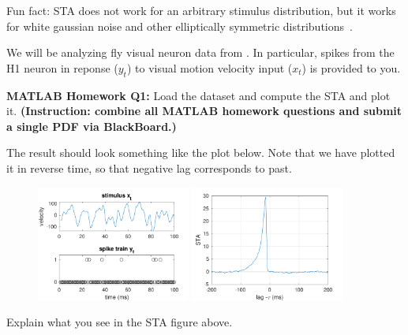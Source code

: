 \documentclass[letterpaper,11pt]{exam}
\begin{document}
\begin{questions}
\begin{tcolorbox}
    Fun fact: STA does not work for an arbitrary stimulus distribution, but it works for white gaussian noise and other elliptically symmetric distributions~\cite{Paninski2003,Park2013f}.
\end{tcolorbox}
We will be analyzing fly visual neuron data from \citet{De_Ruyter_van_Steveninck1997}.
In particular, spikes from the H1 neuron in reponse ($y_t$) to visual motion velocity input ($x_t$) is provided to you.

\question \textbf{MATLAB Homework Q1:} Load the dataset and compute the STA and plot it.
\textbf{(Instruction: combine all MATLAB homework questions and submit a single PDF via BlackBoard.)}

The result should look something like the plot below.
Note that we have plotted it in reverse time, so that negative lag corresponds to past.
\begin{figure}[htb]
    \centering
    \includegraphics[width=0.45\textwidth]{data_segment_worksheet}
    \includegraphics[width=0.45\textwidth]{xc_xy}
\end{figure}
\question Explain what you see in the STA figure above.
\end{questions}
\end{document}
